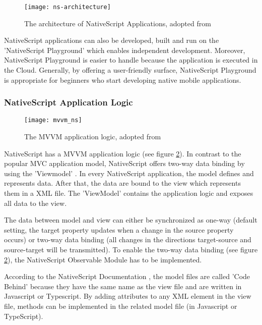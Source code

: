 \begin{figure}
\centering
\texttt{[image: ns-architecture]} 
\caption{\label{fig:nsarchitecture}The architecture of NativeScript Applications, adopted from \cite{nsarchitecture}} 
\end{figure}

NativeScript applications can also be developed, built and run on the 'NativeScript Playground' \cite{nsplayground} which enables independent development. Moreover, NativeScript Playground is easier to handle because the application is executed in the Cloud. Generally, by offering a user-friendly surface, NativeScript Playground is appropriate for beginners who start developing native mobile applications.

\subsubsection{NativeScript Application Logic}

\begin{figure}
\centering
\texttt{[image: mvvm\_ns]} 
\caption{\label{fig:mvvm}The MVVM application logic, adopted from \cite{nativescript}} 
\end{figure}

NativeScript has a \ac{MVVM} application logic (see figure \ref{fig:mvvm}). In contrast to the popular \ac{MVC} application model, NativeScript offers two-way data binding by using the 'Viewmodel' \cite{nativescript}. In every NativeScript application, the model defines and represents data. After that, the data are bound to the view which represents them in a XML file. The 'ViewModel' contains the application logic and exposes all data to the view. 

The data between model and view can either be synchronized as one-way (default setting, the target property updates when a change in the source property occurs) or two-way data binding (all changes in the directions target-source and source-target will be transmitted). To enable the two-way data binding (see figure \ref{fig:mvvm}), the NativeScript Observable Module has to be implemented. 

According to the NativeScript Documentation \cite{nativescript}, the model files are called 'Code Behind' because they have the same name as the view file and are written in Javascript or Typescript. By adding attributes to any XML element in the view file, methods can be implemented in the related model file (in Javascript or TypeScript). 

